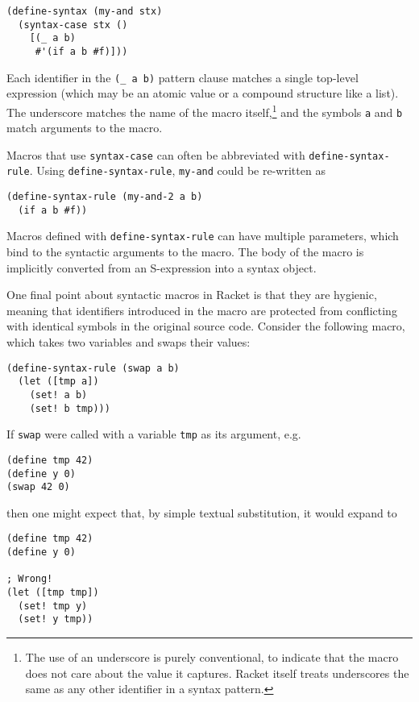 \documentclass{article}
\begin{document}
\begin{lstlisting}
(define-syntax (my-and stx)
  (syntax-case stx ()
    [(_ a b)
     #'(if a b #f)]))
\end{lstlisting}

Each identifier in the \texttt{(\_ a b)} pattern clause matches a single top-level expression (which may be an atomic value or a compound structure like a list). The underscore matches the name of the macro itself,\footnote{The use of an underscore is purely conventional, to indicate that the macro does not care about the value it captures. Racket itself treats underscores the same as any other identifier in a syntax pattern.} and the symbols \texttt{a} and \texttt{b} match arguments to the macro.

Macros that use \texttt{syntax-case} can often be abbreviated with \texttt{define-syntax-rule}. Using \texttt{define-syntax-rule}, \texttt{my-and} could be re-written as

\begin{lstlisting}
(define-syntax-rule (my-and-2 a b)
  (if a b #f))
\end{lstlisting}

Macros defined with \texttt{define-syntax-rule} can have multiple parameters, which bind to the syntactic arguments to the macro. The body of the macro is implicitly converted from an S-expression into a syntax object.

One final point about syntactic macros in Racket is that they are hygienic, meaning that identifiers introduced in the macro are protected from conflicting with identical symbols in the original source code. Consider the following macro, which takes two variables and swaps their values:

\begin{lstlisting}
(define-syntax-rule (swap a b)
  (let ([tmp a])
    (set! a b)
    (set! b tmp)))
\end{lstlisting}

If \texttt{swap} were called with a variable \texttt{tmp} as its argument, e.g.

\begin{lstlisting}
(define tmp 42)
(define y 0)
(swap 42 0)
\end{lstlisting}

\noindent then one might expect that, by simple textual substitution, it would expand to

\begin{lstlisting}
(define tmp 42)
(define y 0)

; Wrong!
(let ([tmp tmp])
  (set! tmp y)
  (set! y tmp))
\end{lstlisting}
\end{document}
